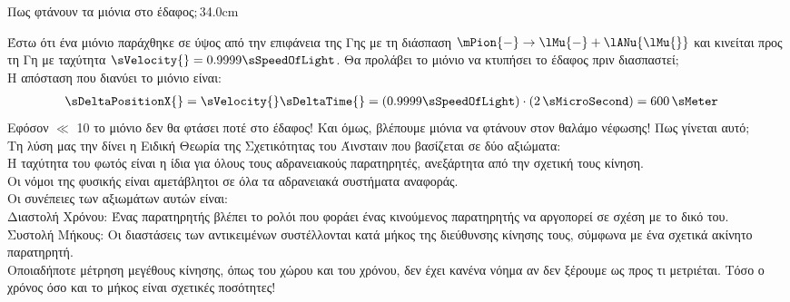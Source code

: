 
\begin{MyColumnRight}[detach title,before upper={\tcbtitle\quad}]{Πως φτάνουν τα μιόνια στο έδαφος$;$}{34.0cm}

  Έστω ότι ένα μιόνιο παράχθηκε σε ύψος  \sKiloMeter \gr από την
  επιφάνεια της Γης με τη διάσπαση $\mPion{-} \to \lMu{-} +
  \lANu{\lMu{}}$ και κινείται προς τη Γη με
  ταχύτητα $\sVelocity{} =0.9999 \sSpeedOfLight$. Θα προλάβει το μιόνιο
  να κτυπήσει το έδαφος πριν διασπαστεί$;$\\ 

Η απόσταση που διανύει το μιόνιο είναι:
\en
\begin{align*}
\sDeltaPositionX{} &= \sVelocity{} \sDeltaTime{} = \left(0.9999
\sSpeedOfLight\right) \cdot \left(2 \,\sMicroSecond\right) = 600 \,\sMeter
\end{align*}
\gr
Εφόσον  \sMeter $\ll$ 10 \sKiloMeter\gr το μιόνιο δεν θα φτάσει
ποτέ στο έδαφος! Και όμως, βλέπουμε μιόνια να φτάνουν στον θαλάμο νέφωσης! Πως γίνεται αυτό$;$ \\

Τη λύση μας την δίνει η Ειδική Θεωρία της Σχετικότητας του Άινσταιν που
βασίζεται σε δύο αξιώματα:\\
 Η ταχύτητα του φωτός είναι η ίδια για όλους τους αδρανειακούς παρατηρητές, ανεξάρτητα από την
σχετική τους κίνηση.
\\
 Οι νόμοι της φυσικής είναι αμετάβλητοι σε όλα τα αδρανειακά συστήματα αναφοράς.
\\

Οι συνέπειες των αξιωμάτων αυτών είναι:\\
 Διαστολή Χρόνου: Ένας παρατηρητής βλέπει το ρολόι που φοράει ένας
κινούμενος παρατηρητής να αργοπορεί σε σχέση με το δικό του.%
\\
 Συστολή Μήκους: Οι διαστάσεις των αντικειμένων συστέλλονται κατά
μήκος της διεύθυνσης κίνησης τους, σύμφωνα με ένα σχετικά ακίνητο παρατηρητή.
\\

Οποιαδήποτε μέτρηση μεγέθους κίνησης, όπως του χώρου και του χρόνου,
δεν έχει κανένα νόημα αν δεν ξέρουμε ως προς τι μετριέται. Τόσο ο χρόνος όσο και το μήκος είναι σχετικές ποσότητες!

\end{MyColumnRight}



